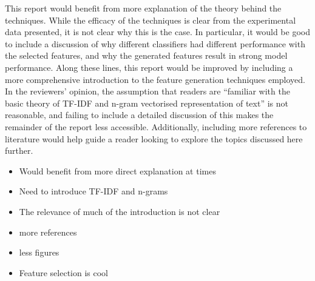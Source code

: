 \documentclass[11pt]{article}
\begin{document}
This report would benefit from more explanation of the theory behind the techniques. While the efficacy of the techniques is clear from the experimental data presented, it is not clear why this is the case. In particular, it would be good to include a discussion of why different classifiers had different performance with the selected features, and why the generated features result in strong model performance. Along these lines, this report would be improved by including a more comprehensive introduction to the feature generation techniques employed. In the reviewers' opinion, the assumption that readers are ``familiar with the basic theory of TF-IDF and n-gram vectorised representation of text'' is not reasonable, and failing to include a detailed discussion of this makes the remainder of the report less accessible. Additionally, including more references to literature would help guide a reader looking to explore the topics discussed here further.

\begin{itemize}
    \item Would benefit from more direct explanation at times
    \item Need to introduce TF-IDF and n-grams
    \item The relevance of much of the introduction is not clear
    \item more references 
    \item less figures
    \item Feature selection is cool
\end{itemize}
\end{document}
